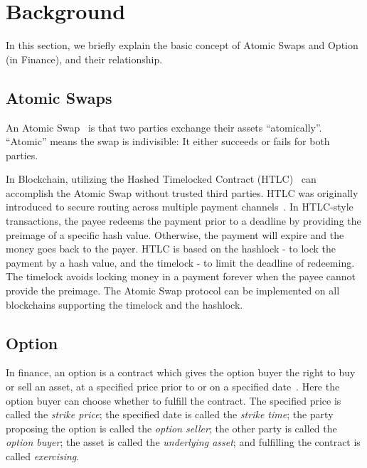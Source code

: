 \section{Background}
\label{sec:background}

In this section, we briefly explain the basic concept of Atomic Swaps and Option (in Finance), and their relationship.

\subsection{Atomic Swaps}

An Atomic Swap~\cite{nolan2013alt} is that two parties exchange their assets ``atomically''.
``Atomic'' means the swap is indivisible: It either succeeds or fails for both parties.

In Blockchain, utilizing the Hashed Timelocked Contract (HTLC)~\cite{poon2016bitcoin} can accomplish the Atomic Swap without trusted third parties. HTLC was originally introduced to secure routing across multiple payment channels~\cite{paychannel2018btcwiki}.
In HTLC-style transactions, the payee redeems the payment prior to a deadline by providing the preimage of a specific hash value.
Otherwise, the payment will expire and the money goes back to the payer.
HTLC is based on the hashlock - to lock the payment by a hash value, and the timelock - to limit the deadline of redeeming. The timelock avoids locking money in a payment forever when the payee cannot provide the preimage.
The Atomic Swap protocol can be implemented on all blockchains supporting the timelock and the hashlock.


\subsection{Option}
\label{subsec:background_option}

In finance, an option is a contract which gives the option buyer the right to buy or sell an asset, at a specified price prior to or on a specified date~\cite{higham2004introduction}.
Here the option buyer can choose whether to fulfill the contract.
The specified price is called the \textit{strike price};
the specified date is called the \textit{strike time};
the party proposing the option is called the \textit{option seller};
the other party is called the \textit{option buyer};
the asset is called the \textit{underlying asset};
and fulfilling the contract is called \textit{exercising}.

